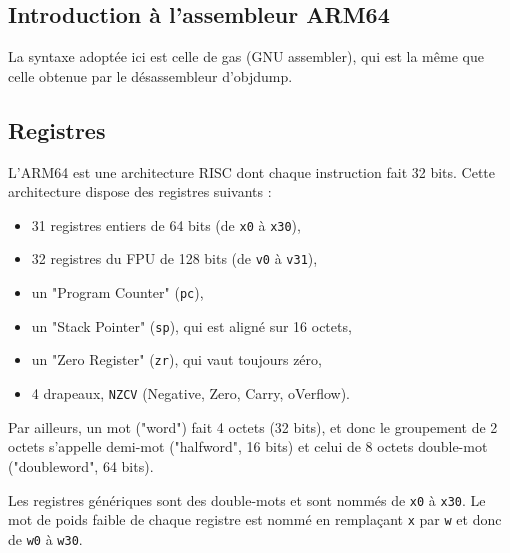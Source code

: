 \documentclass[a4paper,10pt]{article}
\begin{document}
\begin{appendices}
\section{Introduction à l'assembleur ARM64}
\label{IntroARM64}

La syntaxe adoptée ici est celle de gas (GNU assembler), qui est la même que celle obtenue par le désassembleur d'objdump.

\subsection{Registres}

L'ARM64 est une architecture RISC dont chaque instruction fait 32 bits. Cette architecture dispose des registres suivants :
\begin{itemize}
\item 31 registres entiers de 64 bits (de \texttt{x0} à \texttt{x30}),
\item 32 registres du FPU de 128 bits (de \texttt{v0} à \texttt{v31}),
\item un "Program Counter" (\texttt{pc}),
\item un "Stack Pointer" (\texttt{sp}), qui est aligné sur 16 octets,
\item un "Zero Register" (\texttt{zr}), qui vaut toujours zéro,
\item 4 drapeaux, \texttt{NZCV} (Negative, Zero, Carry, oVerflow).
\end{itemize}

Par ailleurs, un mot ("word") fait 4 octets (32 bits), et donc le groupement de 2 octets s'appelle demi-mot ("halfword", 16 bits) et celui de 8 octets double-mot ("doubleword", 64 bits).

Les registres génériques sont des double-mots et sont nommés de \texttt{x0} à \texttt{x30}. Le mot de poids faible de chaque registre est nommé en remplaçant \texttt{x} par \texttt{w} et donc de \texttt{w0} à \texttt{w30}.


\end{appendices}
\end{document}
